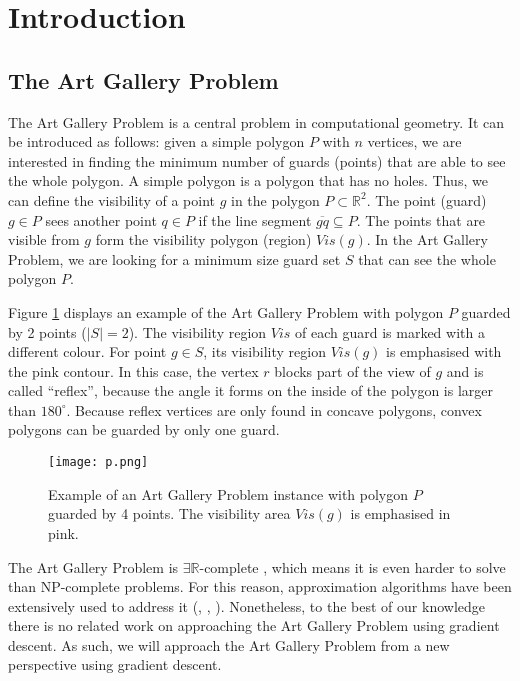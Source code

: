 \section{Introduction}
\subsection{The Art Gallery Problem}

The Art Gallery Problem \cite{o1987art} is a central problem in computational geometry. It can be introduced as follows: given a simple polygon $P$ with $n$ vertices, we are interested in finding the minimum number of guards (points) that are able to see the whole polygon. A simple polygon is a polygon that has no holes. Thus, we can define the visibility of a point $g$ in the polygon $P \subset \mathbb R^2$. The point (guard) $g \in P$ sees another point $q \in P$ if the line segment $\overline{gq} \subseteq P$. The points that are visible from $g$ form the visibility polygon (region) $Vis(g)$. In the Art Gallery Problem, we are looking for a minimum size guard set $S$ that can see the whole polygon $P$.

Figure \ref{fig:art} displays an example of the Art Gallery Problem \cite{o1987art} with polygon $P$ guarded by 2 points ($|S| = 2$). The visibility region $Vis$ of each guard is marked with a different colour. For point $g \in S$, its visibility region $Vis(g)$ is emphasised with the pink contour. In this case, the vertex $r$ blocks part of the view of $g$ and is called ``reflex'', because the angle it forms on the inside of the polygon is larger than $180^\circ$. Because reflex vertices are only found in concave polygons, convex polygons can be guarded by only one guard.

\begin{figure}[h!]
    \centering
    \texttt{[image: p.png]}
    \caption{Example of an Art Gallery Problem instance with polygon $P$ guarded by 4 points. The visibility area $Vis(g)$ is emphasised in pink.}
    \label{fig:art}
\end{figure}

The Art Gallery Problem \cite{o1987art} is $\exists \mathbb R$-complete \cite{abrahamsen2021art}, which means it is even harder to solve than NP-complete problems. For this reason, approximation algorithms have been extensively used to address it (\cite{DBLP:journals/corr/BonnetM16b}, \cite{GHOSH2010718}, \cite{DBLP:journals/corr/abs-2007-06920}). Nonetheless, to the best of our knowledge there is no related work on approaching the Art Gallery Problem \cite{o1987art} using gradient descent. As such, we will approach the Art Gallery Problem \cite{o1987art} from a new perspective using gradient descent.

